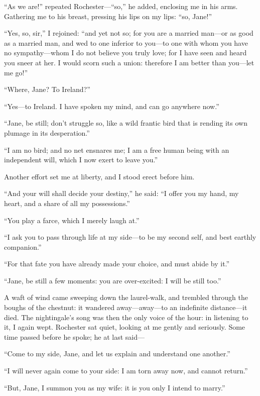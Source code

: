 \enquote{As we are!} repeated \Mr{} Rochester---\enquote{so,} he added,
enclosing me in his arms. Gathering me to his breast, pressing his lips
on my lips: \enquote{so, Jane!}

\enquote{Yes, so, sir,} I rejoined: \enquote{and yet not so; for you are
	a married man---or as good as a married man, and wed to one inferior to
	you---to one with whom you have no sympathy---whom I do not believe you
	truly love; for I have seen and heard you sneer at her. I would scorn
	such a union: therefore I am better than you---let me go!}

\enquote{Where, Jane? To Ireland?}

\enquote{Yes---to Ireland. I have spoken my mind, and can go anywhere
	now.}

\enquote{Jane, be still; don't struggle so, like a wild frantic bird
	that is rending its own plumage in its desperation.}

\enquote{I am no bird; and no net ensnares me; I am a free human being
	with an independent will, which I now exert to leave you.}

Another effort set me at liberty, and I stood erect before him.

\enquote{And your will shall decide your destiny,} he said: \enquote{I
	offer you my hand, my heart, and a share of all my possessions.}

\enquote{You play a farce, which I merely laugh at.}

\enquote{I ask you to pass through life at my side---to be my second
	self, and best earthly companion.}

\enquote{For that fate you have already made your choice, and must abide
	by it.}

\enquote{Jane, be still a few moments: you are over-excited: I will be
	still too.}

A waft of wind came sweeping down the laurel-walk, and trembled through
the boughs of the chestnut: it wandered away---away---to an indefinite
distance---it died. The nightingale's song was then the only voice of
the hour: in listening to it, I again wept. \Mr{} Rochester sat quiet,
looking at me gently and seriously. Some time passed before he spoke;
he at last said---

\enquote{Come to my side, Jane, and let us explain and understand one
	another.}

\enquote{I will never again come to your side: I am torn away now, and
	cannot return.}

\enquote{But, Jane, I summon you as my wife: it is you only I intend to
	marry.}

